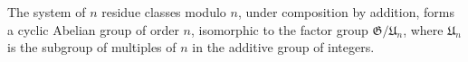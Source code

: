 The system of $n$ residue classes modulo $n$, under composition by addition, forms a cyclic Abelian group of order $n$, isomorphic to the factor group $\mathfrak{G}/\mathfrak{U}_n$, where $\mathfrak{U}_n$ is the subgroup of multiples of $n$ in the additive group of integers.
